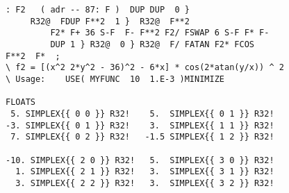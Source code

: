 \begin{lstlisting}
: F2   ( adr -- 87: F )  DUP DUP  0 }
     R32@  FDUP F**2  1 }  R32@  F**2
         F2* F+ 36 S-F  F- F**2 F2/ FSWAP 6 S-F F* F-
         DUP 1 } R32@  0 } R32@  F/ FATAN F2* FCOS
F**2  F*  ;
\ f2 = [(x^2 2*y^2 - 36)^2 - 6*x] * cos(2*atan(y/x)) ^ 2
\ Usage:    USE( MYFUNC  10  1.E-3 )MINIMIZE

FLOATS
 5. SIMPLEX{{ 0 0 }} R32!    5.  SIMPLEX{{ 0 1 }} R32!
-3. SIMPLEX{{ 0 1 }} R32!    3.  SIMPLEX{{ 1 1 }} R32!
 7. SIMPLEX{{ 0 2 }} R32!   -1.5 SIMPLEX{{ 1 2 }} R32!

-10. SIMPLEX{{ 2 0 }} R32!   5.  SIMPLEX{{ 3 0 }} R32!
  1. SIMPLEX{{ 2 1 }} R32!   3.  SIMPLEX{{ 3 1 }} R32!
  3. SIMPLEX{{ 2 2 }} R32!   3.  SIMPLEX{{ 3 2 }} R32!
\end{lstlisting}